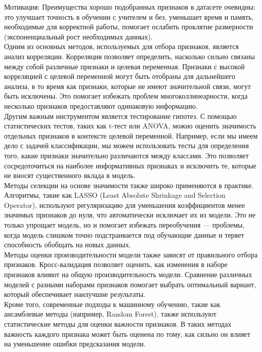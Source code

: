 Мотивация: Преимущества хорошо подобранных признаков в датасете очевидны: это улучшает точность в обучении с учителем и без, уменьшает время и память, необходимые для корректной работы, помогает ослабить проклятие размерности (экспоненциальный рост необходимых данных). \\

Одним из основных методов, используемых для отбора признаков, является анализ корреляции. Корреляция позволяет определить, насколько сильно связаны между собой различные признаки и целевая переменная. Признаки с высокой корреляцией с целевой переменной могут быть отобраны для дальнейшего анализа, в то время как признаки, которые не имеют значительной связи, могут быть исключены. Это помогает избежать проблем многоколлинеарности, когда несколько признаков предоставляют одинаковую информацию.\\

Другим важным инструментом является тестирование гипотез. С помощью статистических тестов, таких как t-тест или ANOVA, можно оценить значимость отдельных признаков в контексте целевой переменной. Например, если мы имеем дело с задачей классификации, мы можем использовать тесты для определения того, какие признаки значительно различаются между классами. Это позволяет сосредоточиться на наиболее информативных признаках и исключить те, которые не вносят существенного вклада в модель.\\

Методы селекции на основе значимости также широко применяются в практике. Алгоритмы, такие как LASSO (Least Absolute Shrinkage and Selection Operator), используют регуляризацию для уменьшения коэффициентов менее значимых признаков до нуля, что автоматически исключает их из модели. Это не только упрощает модель, но и помогает избежать переобучения — проблемы, когда модель слишком точно подстраивается под обучающие данные и теряет способность обобщать на новых данных.\\

Методы оценки производительности модели также зависят от правильного отбора признаков. Кросс-валидация позволяет оценить, как изменения в наборе признаков влияют на общую производительность модели. Сравнение различных моделей с разными наборами признаков помогает выбрать оптимальный вариант, который обеспечивает наилучшие результаты.\\

Кроме того, современные подходы к машинному обучению, такие как ансамблевые методы (например, Random Forest), также используют статистические методы для оценки важности признаков. В таких методах важность каждого признака может быть оценена по тому, как сильно он влияет на уменьшение ошибки предсказания модели. \\

